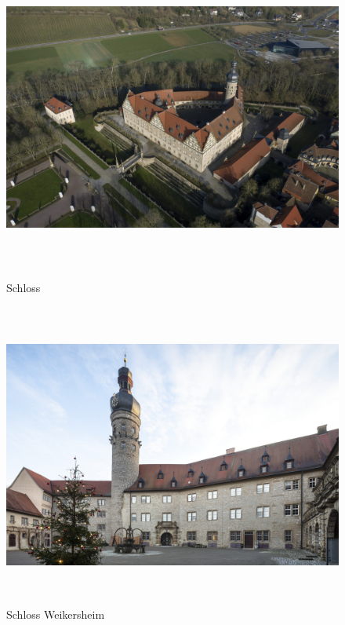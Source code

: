 \documentclass[
  a4paper,
]{book}
\begin{document}
\begin{figure}
\includegraphics[height=10cm]{images/fmd10024322a.jpg}

\caption{Schloss}
\label{fig:{images/fmd10024322a.jpg}}

\clearpage

\centering

\includegraphics[height=10cm]{images/fmd10005902a.jpg}

\caption{Schloss Weikersheim}
\label{fig:{images/fmd10005902a.jpg}}

\clearpage

\centering


\end{figure}
\end{document}
